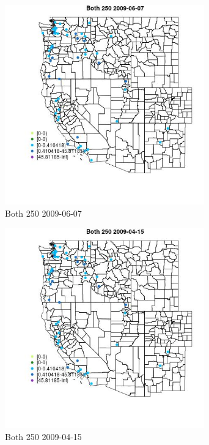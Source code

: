 \begin{figure} 
\centering  
\includegraphics[width=0.77\textwidth]{Code_Outputs/Report_ML_input_PM25_Step4_part_e_de_duplicated_aves_MapObsBoth_2502009-06-07.jpg} 
\caption{\label{fig:Report_ML_input_PM25_Step4_part_e_de_duplicated_avesMapObsBoth_2502009-06-07}Both 250 2009-06-07} 
\end{figure} 
 

\begin{figure} 
\centering  
\includegraphics[width=0.77\textwidth]{Code_Outputs/Report_ML_input_PM25_Step4_part_e_de_duplicated_aves_MapObsBoth_2502009-04-15.jpg} 
\caption{\label{fig:Report_ML_input_PM25_Step4_part_e_de_duplicated_avesMapObsBoth_2502009-04-15}Both 250 2009-04-15} 
\end{figure} 
 

